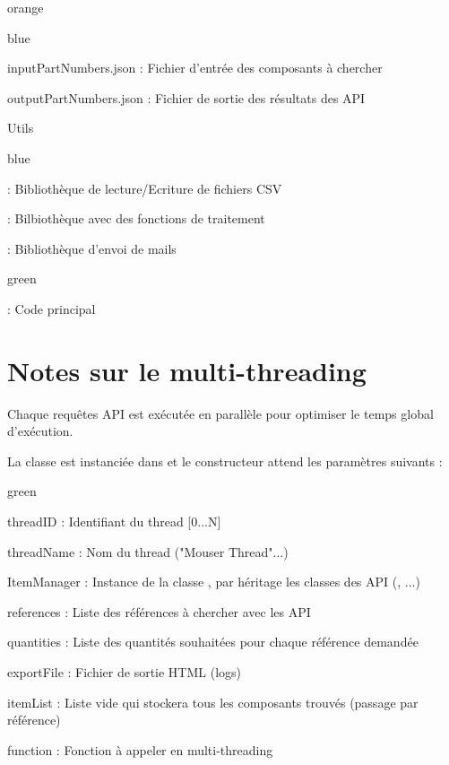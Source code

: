 \begin{items}{orange}{\Triangle}
\begin{items}{blue}{\Triangle}
\item inputPartNumbers.json : Fichier d'entrée des composants à chercher
\item outputPartNumbers.json : Fichier de sortie des résultats des API
\end{items}
\item Utils
\begin{items}{blue}{\Triangle}
\item {} : Bibliothèque de lecture/Ecriture de fichiers CSV
\item {} : Bilbiothèque avec des fonctions de traitement
\item {} : Bibliothèque d'envoi de mails
\end{items}
\end{items}
\begin{items}{green}{\Triangle}
\item {} : Code principal

\end{items}


\section{Notes sur le multi-threading} 

Chaque \label{multithrading} requêtes API est exécutée en parallèle pour optimiser le temps global d'exécution.

La classe  est instanciée dans  et le constructeur attend les paramètres suivants : 
\begin{items}{green}{\Triangle}
\item threadID : Identifiant du thread [0...N]
\item threadName : Nom du thread ("Mouser Thread"...)
\item ItemManager : Instance de la classe , par héritage les classes des API (, ...)
\item references : Liste des références à chercher avec les API
\item quantities : Liste des quantités souhaitées pour chaque référence demandée
\item exportFile : Fichier de sortie HTML (logs)
\item itemList : Liste vide qui stockera tous les composants trouvés (passage par référence)
\item function : Fonction à appeler en multi-threading
\end{items}


